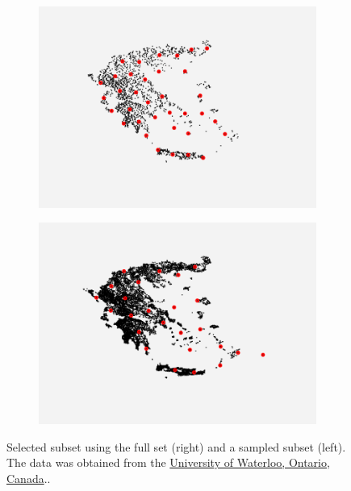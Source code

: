 \begin{figure}[!h] 
  \centering
  \begin{subfigure}[b]{0.4\linewidth}
    \centering
    \includegraphics[width=0.9\linewidth]{Pictures/rs_greece} 
    \label{fig:ls_greece} 
  \end{subfigure}%
  \begin{subfigure}[b]{0.4\linewidth}
    \centering
    \includegraphics[width=0.9\linewidth]{Pictures/ls_greece} 
    \label{fig:rs_greece} 
  \end{subfigure}
  \caption[Selected subset using the full set and a sampled subset]{Selected subset using the full set (right) and a sampled subset (left). The data was obtained from the \href{http://www.math.uwaterloo.ca/tsp/world/grpoints.html}{University of Waterloo, Ontario, Canada}.\cite{waterloo_greece}.}
  \label{fig:ls_rs_greece} 
\end{figure}

